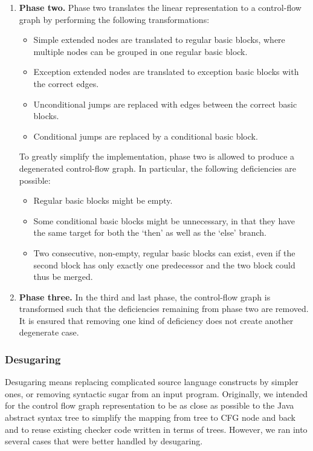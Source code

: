 \begin{enumerate}
    \item \textbf{Phase two.} Phase two translates the linear representation to a control-flow graph
    by performing the following transformations:
    \begin{itemize}
        \item Simple extended nodes are translated to regular basic blocks, where multiple nodes
        can be grouped in one regular basic block.
        \item Exception extended nodes are translated to exception basic blocks with the correct edges.
        \item Unconditional jumps are replaced with edges between the correct basic blocks.
        \item Conditional jumps are replaced by a conditional basic block.
    \end{itemize}
    To greatly simplify the implementation, phase two is allowed to produce a degenerated control-flow
    graph. In particular, the following deficiencies are possible:
    \begin{itemize}
    \item Regular basic blocks might be empty.
    \item Some conditional basic blocks might be unnecessary, in that they have the same target for both
    the `then' as well as the `else' branch.
    \item Two consecutive, non-empty, regular basic blocks can exist, even if the second block has only
    exactly one predecessor and the two block could thus be merged.
    \end{itemize}
    \item \textbf{Phase three.} In the third and last phase, the control-flow graph is transformed such that
    the deficiencies remaining from phase two are removed. It is ensured that removing one kind of deficiency
    does not create another degenerate case.
\end{enumerate}



\subsubsection{Desugaring}
\label{sec:desugaring}

Desugaring means replacing complicated source language constructs by simpler ones, or removing syntactic sugar from an input program.  Originally, we intended for the control flow graph representation to be as close as possible to the Java abstract syntax tree to simplify the mapping from tree to CFG node and back and to reuse existing checker code written in terms of trees.  However, we ran into several cases that were better handled by desugaring.

